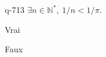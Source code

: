 \begin{truefalse}{q-713}
$\exists n \in \mathbb N^*,\: 1/n<1/\pi$.
\item* Vrai
\item Faux
\end{truefalse}

